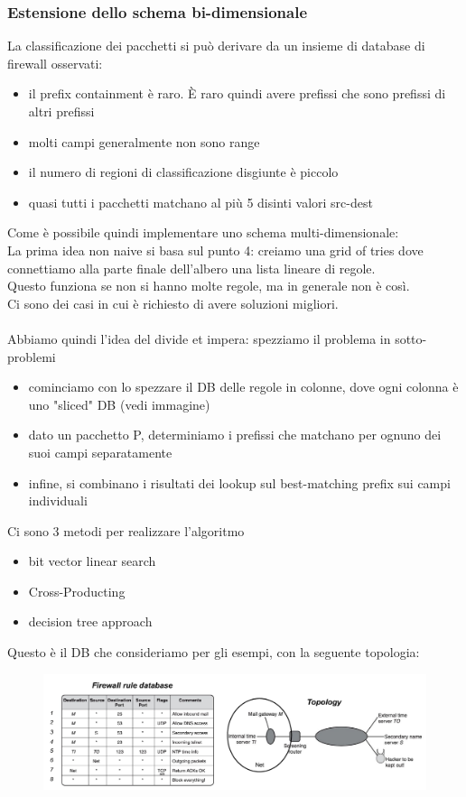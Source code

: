 \documentclass[12pt, oneside]{extbook} %
\begin{document}
\subsubsection{Estensione dello schema bi-dimensionale}
La classificazione dei pacchetti si può derivare da un insieme di database di firewall osservati:
\begin{itemize}
    \item il prefix containment è raro. È raro quindi avere prefissi che sono prefissi di altri prefissi
    \item molti campi generalmente non sono range
    \item il numero di regioni di classificazione disgiunte è piccolo
    \item quasi tutti i pacchetti matchano al più 5 disinti valori src-dest
\end{itemize}
Come è  possibile quindi implementare uno schema multi-dimensionale:
\\La prima idea non naive si basa sul punto 4: creiamo una grid of tries dove connettiamo alla parte finale dell'albero una lista lineare di regole.
\\Questo funziona se non si hanno molte regole, ma in generale non è così.
\\Ci sono dei casi in cui è richiesto di avere soluzioni migliori.
\\\\Abbiamo quindi l'idea del divide et impera: spezziamo il problema in sotto-problemi
\begin{itemize}
\item cominciamo con lo spezzare il DB delle regole in colonne, dove ogni colonna è uno "sliced" DB (vedi immagine)
\item dato un pacchetto P, determiniamo i prefissi che matchano per ognuno dei suoi campi separatamente
\item infine, si combinano i risultati dei lookup sul best-matching prefix sui campi individuali
\end{itemize}
Ci sono 3 metodi per realizzare l'algoritmo
\begin{itemize}
    \item bit vector linear search
    \item Cross-Producting
    \item decision tree approach
\end{itemize}
Questo è il DB che consideriamo per gli esempi, con la seguente topologia:\\
\begin{figure}[h!]
    \centering
    \includegraphics[scale=0.5]{../../immagini/bidim_topology}
\end{figure}\\\\
\end{document}
